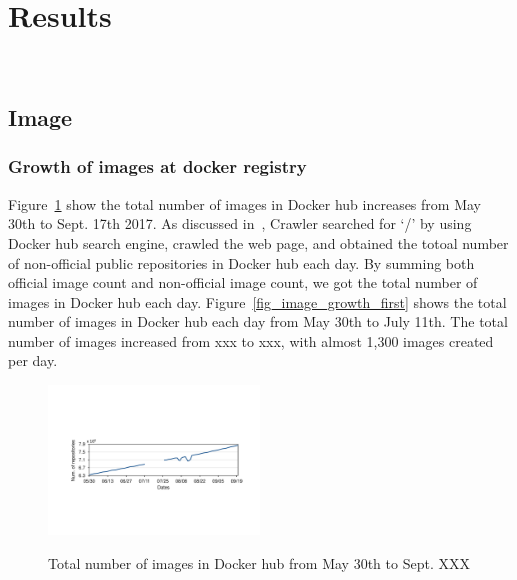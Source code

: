 
\section{Results}

\\

\subsection{Image}

\subsubsection{Growth  of images at docker registry}

Figure~\ref{fig_image_growth} show the total number of images in Docker hub increases from May 30th to Sept. 17th 2017. As discussed in~\cite{XXX}, Crawler searched for `/' by using Docker hub search engine, crawled the web page, and obtained the totoal number of non-official public repositories in Docker hub each day. By summing both official image count and non-official image count, we got the total number of images in Docker hub each day. Figure~\ref{fig_image_growth_first} shows the total number of images in Docker hub each day from May 30th to July 11th. The total number of images increased from xxx to xxx, with almost 1,300 images created per day.

\begin{figure}
  \centering
  \includegraphics[width=0.5\textwidth]{graphs/image_growth}\\
  \caption{Total number of images in Docker hub from May 30th to Sept. XXX}\label{fig_image_growth}
\end{figure}

